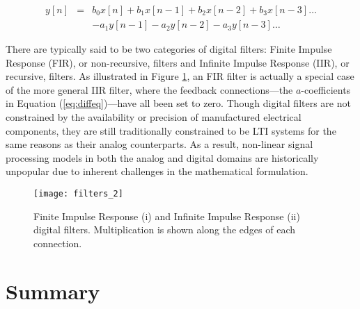 \begin{equation}
\label{eq:diffeq}
\begin{array}{rcr}
y[n] & = & b_0x[n] + b_1x[n-1] + b_2x[n-2] + b_3x[n-3] \ldots \\
 & & - a_1y[n-1] - a_2y[n-2] - a_3y[n-3] \ldots
\end{array}
\end{equation}

There are typically said to be two categories of digital filters: Finite Impulse Response (FIR), or non-recursive, filters and Infinite Impulse Response (IIR), or recursive, filters.
As illustrated in Figure \ref{fig:filters}, an FIR filter is actually a special case of the more general IIR filter, where the feedback connections---the $a$-coefficients in Equation (\ref{eq:diffeq})---have all been set to zero.
Though digital filters are not constrained by the availability or precision of manufactured electrical components, they are still traditionally constrained to be LTI systems for the same reasons as their analog counterparts.
As a result, non-linear signal processing models in both the analog and digital domains are historically unpopular due to inherent challenges in the mathematical formulation.

\begin{figure}[!t]
\centering
\texttt{[image: filters\_2]}
\caption{\small{Finite Impulse Response (i) and Infinite Impulse Response (ii) digital filters. Multiplication is shown along the edges of each connection.}}
\label{fig:filters}
\end{figure}


\section{Summary}

